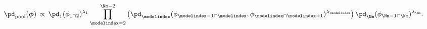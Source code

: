 \begin{equation}
  \pd_{\text{pool}}(\boldsymbol{\phi}) \, \propto \, 
  \pd_{1}(\phi_{1 \cap 2})^{\lambda_{1}}
  \prod_{\modelindex = 2}^{\Nm - 2} \left( 
    \pd_{\modelindex}(\phi_{\modelindex - 1\cap \modelindex}, \phi_{\modelindex \cap \modelindex + 1})^{\lambda_{\modelindex}}
  \right)
  \pd_{\Nm}(\phi_{\Nm - 1 \cap \Nm})^{\lambda_{\Nm}}.
  \label{eqn:M-model-linear-pooling}
\end{equation}